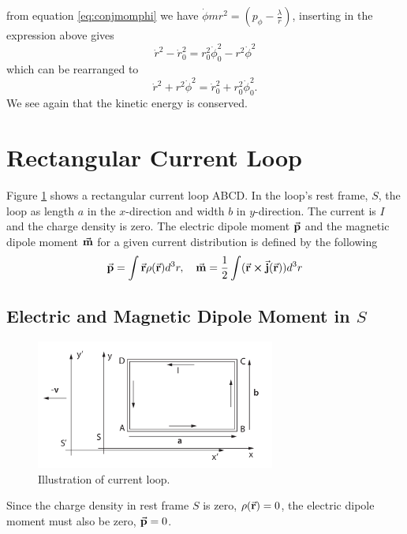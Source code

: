 \documentclass[11pt]{amsart}
\begin{document}
from equation \ref{eq:conjmomphi} we have $\dot{\phi}mr^2 = \left(p_\phi-\frac{\lambda}{r}\right)$, inserting in the expression above gives
\begin{equation*}
\dot{r}^2 - \dot{r}_0^2 = r_0^2\dot{\phi}_0^2 - r^2\dot{\phi}^2
\end{equation*}
which can be rearranged to
\begin{equation}
\dot{r}^2 + r^2\dot{\phi}^2 = \dot{r}_0^2 + r_0^2\dot{\phi}_0^2.
\end{equation}
We see again that the kinetic energy is conserved.

\section{Rectangular Current Loop}
Figure \ref{fig:currentloop} shows a rectangular current loop ABCD. In the loop's rest frame, $S$, the loop as length $a$ in the $x$-direction and width $b$ in $y$-direction. The current is $I$ and the charge density is zero. The electric dipole moment $\va{p}$ and the magnetic dipole moment $\va{m}$ for a given current distribution is defined by the following
\begin{equation}
\label{eq:edm&mdm}
\va{p} = \int\va{r}\rho(\va{r})d^3r, \quad \va{m} = \frac{1}{2}\int(\va{r}\cp\va{j}(\va{r}))d^3r
\end{equation}

\subsection{Electric and Magnetic Dipole Moment in $S$}

\begin{figure}
	\centering
	\includegraphics[width=0.7\textwidth]{currentloop.png}
	\caption{Illustration of current loop.}
	\label{fig:currentloop}
\end{figure}

Since the charge density in rest frame $S$ is zero, $\rho(\va{r}) = 0$, the electric dipole moment must also be zero, $\va{p} = 0$.
\end{document}
